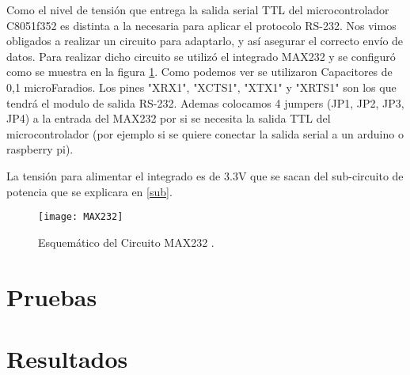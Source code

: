 Como el nivel de tensión que entrega la salida serial TTL del microcontrolador C8051f352 es distinta a la necesaria para aplicar el protocolo RS-232. Nos vimos obligados a realizar un circuito para adaptarlo, y así asegurar el correcto envío de datos. Para realizar dicho circuito se utilizó el integrado MAX232 y se configuró como se muestra en la figura \ref{fig:MAX232}. Como podemos ver se utilizaron Capacitores de 0,1 microFaradios. Los pines "XRX1", "XCTS1", "XTX1" y "XRTS1" son los que tendrá el modulo de salida RS-232.
Ademas colocamos 4 jumpers (JP1, JP2, JP3, JP4) a la entrada del MAX232 por si se necesita la salida TTL del microcontrolador (por ejemplo si se quiere conectar la salida serial a un arduino o raspberry pi).

La tensión para alimentar el integrado es de 3.3V que se sacan del sub-circuito de potencia que se explicara en \ref{sub}.

\begin{figure}[h]
  \centering
  \texttt{[image: MAX232]}
  \caption{Esquemático del Circuito MAX232 .}\label{fig:MAX232}
\end{figure}




\section{Pruebas} %
\label{sec:pruebas}


\section{Resultados} %
\label{sec:resultados}


